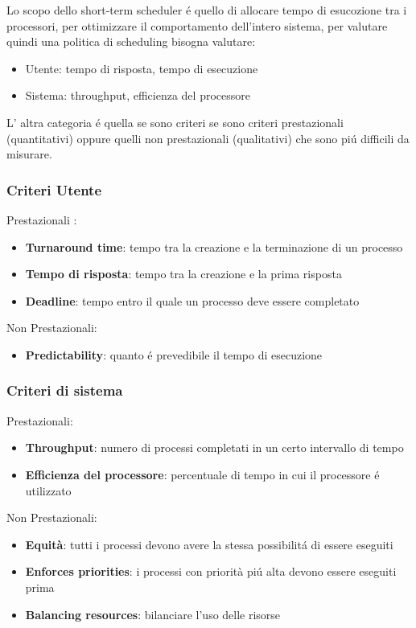 \documentclass[11pt]{article}
\begin{document}
    Lo scopo dello short-term scheduler é quello di allocare tempo di esucozione tra i processori, per ottimizzare
    il comportamento dell'intero sistema, per valutare quindi una politica di scheduling bisogna valutare:
    \begin{itemize}
        \item Utente: tempo di risposta, tempo di esecuzione
        \item Sistema: throughput, efficienza del processore
    \end{itemize}
    L' altra categoria é quella se sono criteri se sono criteri prestazionali (quantitativi) oppure quelli non
    prestazionali (qualitativi) che sono piú difficili da misurare.
    \subsubsection{Criteri Utente}
    Prestazionali :
        \begin{itemize}
        \item   \textbf{Turnaround time}: tempo tra la creazione e la terminazione di un processo
        \item  \textbf{Tempo di risposta}: tempo tra la creazione e la prima risposta
        \item  \textbf{Deadline}: tempo entro il quale un processo deve essere completato
    \end{itemize}
    Non Prestazionali:
    \begin{itemize}
        \item \textbf{Predictability}: quanto é prevedibile il tempo di esecuzione
    \end{itemize}
    \subsubsection{Criteri di sistema}
    Prestazionali:
    \begin{itemize}
        \item \textbf{Throughput}: numero di processi completati in un certo intervallo di tempo
        \item \textbf{Efficienza del processore}: percentuale di tempo in cui il processore é utilizzato
    \end{itemize}
    Non Prestazionali:
    \begin{itemize}
        \item \textbf{Equità}: tutti i processi devono avere la stessa possibilitá di essere eseguiti
        \item \textbf{Enforces priorities}: i processi con priorità piú alta devono essere eseguiti prima
        \item \textbf{Balancing resources}: bilanciare l'uso delle risorse
        \end{itemize}
\end{document}
